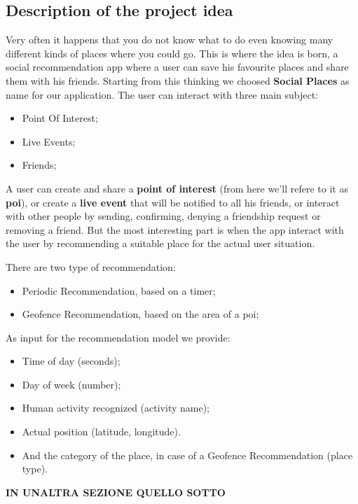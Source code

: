 \documentclass[../../main]{subfiles}
\begin{document}
\subsection{Description of the project idea}
Very often it happens that you do not know what to do even knowing many different kinds of places where you could go.
This is where the idea is born, a social recommendation app where a user can save his favourite places and share them with his friends.
Starting from this thinking we choosed \textbf{Social Places} as name for our application.
The user can interact with three main subject:
\begin{itemize}
    \item Point Of Interest;
    \item Live Events;
    \item Friends;
\end{itemize}
A user can create and share a \textbf{point of interest} (from here we'll refere to it as \textbf{poi}), or create a \textbf{live event} that will be notified to all his friends, or interact with other people by sending, confirming, denying a friendship request or removing a friend.
But the most interesting part is when the app interact with the user by recommending a suitable place for the actual user situation.

There are two type of recommendation:
\begin{itemize}
    \item Periodic Recommendation, based on a timer;
    \item Geofence Recommendation, based on the area of a poi;
\end{itemize}
As input for the recommendation model we provide:
\begin{itemize}
    \item Time of day (seconds);
    \item Day of week (number);
    \item Human activity recognized (activity name);
    \item Actual position (latitude, longitude).
    \item And the category of the place, in case of a Geofence Recommendation (place type).
\end{itemize}
\textbf{IN UNALTRA SEZIONE QUELLO SOTTO}
\end{document}

